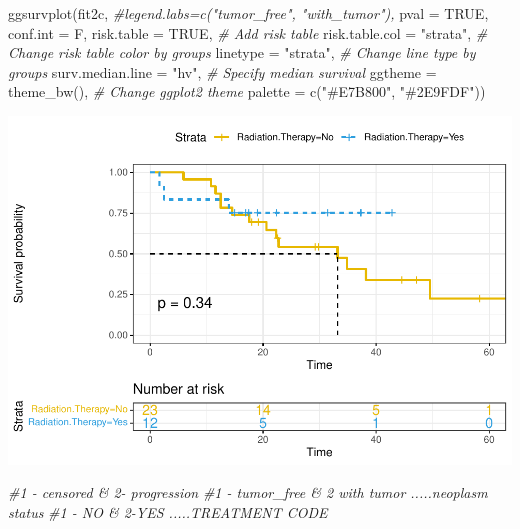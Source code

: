 \documentclass[
  11pt,
]{article}
\newenvironment{Shaded}{\begin{snugshade}}{\end{snugshade}}
\newcommand{\AttributeTok}[1]{\textcolor[rgb]{0.77,0.63,0.00}{#1}}
\newcommand{\CommentTok}[1]{\textcolor[rgb]{0.56,0.35,0.01}{\textit{#1}}}
\newcommand{\ConstantTok}[1]{\textcolor[rgb]{0.00,0.00,0.00}{#1}}
\newcommand{\FunctionTok}[1]{\textcolor[rgb]{0.00,0.00,0.00}{#1}}
\newcommand{\NormalTok}[1]{#1}
\newcommand{\StringTok}[1]{\textcolor[rgb]{0.31,0.60,0.02}{#1}}
\begin{document}
\begin{Shaded}
\begin{Highlighting}[]
\FunctionTok{ggsurvplot}\NormalTok{(fit2c,}
          \CommentTok{\#legend.labs=c("tumor\_free", "with\_tumor"),}
          \AttributeTok{pval =} \ConstantTok{TRUE}\NormalTok{, }\AttributeTok{conf.int =}\NormalTok{ F,}
          \AttributeTok{risk.table =} \ConstantTok{TRUE}\NormalTok{, }\CommentTok{\# Add risk table}
          \AttributeTok{risk.table.col =} \StringTok{"strata"}\NormalTok{, }\CommentTok{\# Change risk table color by groups}
          \AttributeTok{linetype =} \StringTok{"strata"}\NormalTok{, }\CommentTok{\# Change line type by groups}
          \AttributeTok{surv.median.line =} \StringTok{"hv"}\NormalTok{, }\CommentTok{\# Specify median survival}
          \AttributeTok{ggtheme =} \FunctionTok{theme\_bw}\NormalTok{(), }\CommentTok{\# Change ggplot2 theme}
          \AttributeTok{palette =} \FunctionTok{c}\NormalTok{(}\StringTok{"\#E7B800"}\NormalTok{, }\StringTok{"\#2E9FDF"}\NormalTok{))}
\end{Highlighting}
\end{Shaded}

\includegraphics{Random_new_surv_4_files/figure-latex/unnamed-chunk-11-1.pdf}

\begin{Shaded}
\begin{Highlighting}[]
\CommentTok{\#1 {-} censored \& 2{-} progression}
\CommentTok{\#1 {-} tumor\_free \& 2 with tumor .....neoplasm status }
\CommentTok{\#1 {-} NO \& 2{-}YES .....TREATMENT CODE}
\end{Highlighting}
\end{Shaded}
\end{document}

